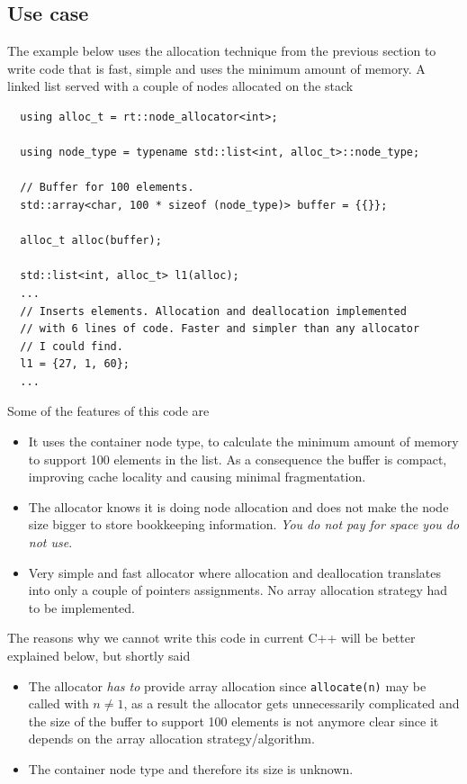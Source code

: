 \documentclass[11pt]{article}
\begin{document}
\subsection{Use case}
The example below uses the allocation technique from the previous section to
write code that is fast, simple and uses the minimum amount of memory. A linked
list served with a couple of nodes allocated on the stack
\medskip
\begin{lstlisting}
  using alloc_t = rt::node_allocator<int>;

  using node_type = typename std::list<int, alloc_t>::node_type;

  // Buffer for 100 elements.
  std::array<char, 100 * sizeof (node_type)> buffer = {{}};

  alloc_t alloc(buffer);

  std::list<int, alloc_t> l1(alloc);
  ...
  // Inserts elements. Allocation and deallocation implemented
  // with 6 lines of code. Faster and simpler than any allocator
  // I could find.
  l1 = {27, 1, 60};
  ...
\end{lstlisting}

Some of the features of this code are
\begin{itemize}

\item It uses the container node type, to calculate the minimum amount of
memory to support 100 elements in the list. As a consequence the buffer is
compact, improving cache locality and causing minimal fragmentation.

\item The allocator knows it is doing node allocation and does not make the
node size bigger to store bookkeeping information. {\it You do not pay for
space you do not use}. 

\item Very simple and fast allocator where allocation and deallocation
translates into only a couple of pointers assignments. No array allocation
strategy had to be implemented.
\end{itemize}

The reasons why we cannot write this code in current C++ will
be better explained below, but shortly said

\begin{itemize}

\item The allocator {\it has to} provide array allocation since 
\texttt{allocate(n)} may be called with $n \ne 1$, as a result
the allocator gets unnecessarily complicated and the size of the
buffer to support 100 elements is not anymore clear since it depends
on the array allocation strategy/algorithm.

\item The container node type and therefore its size is unknown.

\end{itemize}
\end{document}
